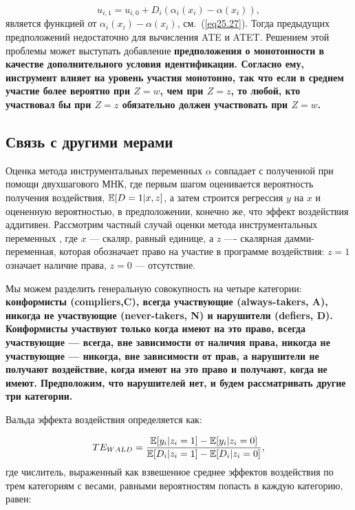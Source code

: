 $$
u_{i,1} = u_{i,0} + D_i (\alpha_i (x_i) - \alpha (x_i)),
$$
является функцией от $\alpha_i (x_i) - \alpha (x_i)$, см.~(\ref{eq25.27}). Тогда предыдущих предположений недостаточно для вычисления ATE и ATET. Решением этой проблемы может выступать добавление \bfseries предположения о монотонности \mdseries в качестве дополнительного условия идентификации. Согласно ему, инструмент влияет на уровень участия монотонно, так что если в среднем участие более вероятно при $Z = w$, чем при $Z = z$, то любой, кто участвовал бы при $Z = z$ обязательно должен участвовать при $Z = w$. 

\subsection{Связь с другими мерами}

Оценка метода инструментальных переменных $\alpha$ совпадает с полученной при помощи двухшагового МНК, где первым шагом оценивается вероятность получения воздействия, $\mathbb{E}[D = 1 | x, z]$, а затем строится регрессия $y$ на $x$ и оцененную вероятностью, в предположении, конечно же, что эффект воздействия аддитивен. Рассмотрим частный случай оценки метода инструментальных переменных , где $x$ --- скаляр, равный единице, а $z$ ---- скалярная дамми-переменная, которая обозначает право на участие в программе воздействия: $z=1$ означает наличие права, $z=0$ --- отсутствие. 

Мы можем разделить генеральную совокупность на четыре категории: \bfseries конформисты (compliers,C)\mdseries, \bfseries всегда участвующие (always-takers, A)\mdseries, \bfseries никогда не участвующие (never-takers, N) \mdseries и \bfseries нарушители (defiers, D)\mdseries. Конформисты участвуют только когда имеют на это право, всегда участвующие --- всегда, вне зависимости от наличия права, никогда не участвующие --- никогда, вне зависимости от прав, а нарушители не получают воздействие, когда имеют на это право и получают, когда не имеют. Предположим, что нарушителей нет, и будем рассматривать другие три категории. 

 Вальда \mdseries эффекта воздействия определяется как:

\begin{equation}
\label{eq25.68}
TE_{WALD} = \frac{\mathbb{E}[y_i | z_i = 1] - \mathbb{E}[y_i | z_i = 0] }{\mathbb{E}[D_i | z_i = 1] - \mathbb{E}[D_i | z_i = 0]},
\end{equation}
где числитель, выраженный как взвешенное среднее эффектов воздействия по трем категориям с весами, равными вероятностям попасть в каждую категорию, равен:

